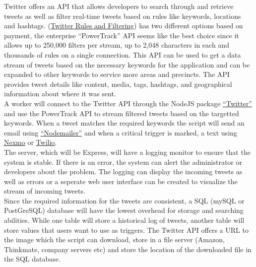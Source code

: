 \documentclass{homework}
\begin{document}
\begin{solution}
    Twitter offers an API that allows developers to search through and retrieve tweets as well as filter real-time tweets based on rules like keywords, locations and hashtags. 
    (\href{https://developer.twitter.com/en/docs/tweets/rules-and-filtering/overview/premium-operators}{Twitter Rules and Filtering}) has two different options based on payment, the enterprise ``PowerTrack'' API seems like the best choice since it allows up to 250,000 filters per stream, up to 2,048 characters in each and thousands of rules on a single connection. This API can be used to get a data stream of tweets based on the necessary keywords for the application and can be expanded to other keywords to service more areas and precincts. The API provides tweet details like content, media, tags, hashtags, and geographical information about where it was sent.\\

    A worker will connect to the Twitter API through the NodeJS package \href{https://www.npmjs.com/package/twitter}{``Twitter''} and use the PowerTrack API to stream filtered tweets based on the targetted keywords. When a tweet matches the required keywords the script will send an email using \href{https://nodemailer.com/}{``Nodemailer''} and when a critical trigger is marked, a text using \href{https://developer.nexmo.com/messaging/sms/overview}{Nexmo} or \href{https://www.twilio.com/docs/sms}{Twilio}.\\
    
    The server, which will be Express, will have a logging monitor to ensure that the system is stable. If there is an error, the system can alert the administrator or developers about the problem. The logging can display the incoming tweets as well as errors or a seperate web user interface can be created to visualize the stream of incoming tweets.\\

    Since the required information for the tweets are consistent, a SQL (mySQL or PostGreSQL) database will have the lowest overhead for storage and searching abilities. While one table will store a historical log of tweets, another table will store values that users want to use as triggers. The Twitter API offers a URL to the image which the script can download, store in a file server (Amazon, Thinkmate, company servers etc) and store the location of the downloaded file in the SQL database. 

\end{solution}
\end{document}
